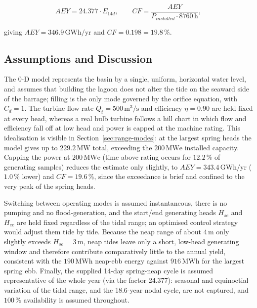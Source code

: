 \begin{equation}
    AEY = 24.377 \cdot E_{14d}, \qquad CF = \frac{AEY}{P_{installed}\cdot 8760\,\mathrm{h}},
    \label{eq:range-aey}
\end{equation}

giving $AEY = 346.9\,\mathrm{GWh/yr}$ and $CF = 0.198 = 19.8\,\%$.

\subsection{Assumptions and Discussion}
\label{sec:range-discussion}
The 0-D model represents the basin by a single, uniform, horizontal water level, and assumes that building the lagoon does not alter the tide on the seaward side of the barrage; filling is the only mode governed by the orifice equation, with $C_d=1$. The turbine flow rate $Q_t=500\,\mathrm{m^3/s}$ and efficiency $\eta=0.90$ are held fixed at every head, whereas a real bulb turbine follows a hill chart in which flow and efficiency fall off at low head and power is capped at the machine rating. This idealisation is visible in Section~\ref{sec:range-modes}: at the largest spring heads the model gives up to $229.2\,\mathrm{MW}$ total, exceeding the $200\,\mathrm{MWe}$ installed capacity. Capping the power at $200\,\mathrm{MWe}$ (time above rating occurs for $12.2\,\%$ of generating samples) reduces the estimate only slightly, to $AEY=343.4\,\mathrm{GWh/yr}$ ($1.0\,\%$ lower) and $CF=19.6\,\%$, since the exceedance is brief and confined to the very peak of the spring heads.

Switching between operating modes is assumed instantaneous, there is no pumping and no flood-generation, and the start/end generating heads $H_{se}$ and $H_{ee}$ are held fixed regardless of the tidal range; an optimised control strategy would adjust them tide by tide. Because the neap range of about $4\,\mathrm{m}$ only slightly exceeds $H_{se}=3\,\mathrm{m}$, neap tides leave only a short, low-head generating window and therefore contribute comparatively little to the annual yield, consistent with the $190\,\mathrm{MWh}$ neap-ebb energy against $916\,\mathrm{MWh}$ for the largest spring ebb. Finally, the supplied 14-day spring-neap cycle is assumed representative of the whole year (via the factor 24.377): seasonal and equinoctial variation of the tidal range, and the 18.6-year nodal cycle, are not captured, and $100\,\%$ availability is assumed throughout.
